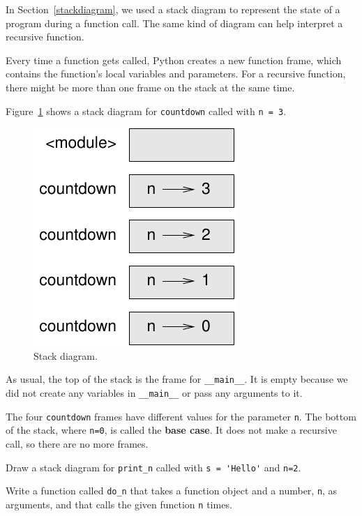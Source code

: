 \documentclass[10pt]{book}
\begin{document}
\begin{CJK}{UTF8}{gbsn}
In Section~\ref{stackdiagram}, we used a stack diagram to represent
the state of a program during a function call.  The same kind of
diagram can help interpret a recursive function.

Every time a function gets called, Python creates a new function
frame, which contains the function's local variables and parameters.
For a recursive function, there might be more than one frame on the
stack at the same time.

Figure~\ref{fig.stack2} shows a stack diagram for {\tt countdown} called with
{\tt n = 3}.

\begin{figure}
\centerline
{\includegraphics[scale=0.8]{figs/stack2.pdf}}
\caption{Stack diagram.}
\label{fig.stack2}
\end{figure}


As usual, the top of the stack is the frame for \verb"__main__".
It is empty because we did not create any variables in 
\verb"__main__" or pass any arguments to it.

The four {\tt countdown} frames have different values for the
parameter {\tt n}.  The bottom of the stack, where {\tt n=0}, is
called the {\bf base case}.  It does not make a recursive call, so
there are no more frames.

\begin{exercise}
Draw a stack diagram for \verb"print_n" called with
\verb"s = 'Hello'" and {\tt n=2}.
\end{exercise}

\begin{exercise}
Write a function called \verb"do_n" that takes a function
object and a number, {\tt n}, as arguments, and that calls
the given function {\tt n} times.
\end{exercise}




\end{CJK}
\end{document}
